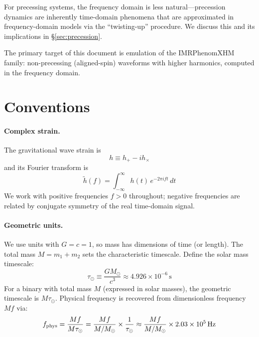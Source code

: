 \documentclass[11pt,a4paper]{article}
\begin{document}
For precessing systems, the frequency domain is less natural---precession dynamics are inherently time-domain phenomena that are approximated in frequency-domain models via the ``twisting-up'' procedure. We discuss this and its implications in \S\ref{sec:precession}.

The primary target of this document is emulation of the IMRPhenomXHM family: non-precessing (aligned-spin) waveforms with higher harmonics, computed in the frequency domain.

\section{Conventions}
\label{sec:conventions}

\paragraph{Complex strain.} The gravitational wave strain is
\begin{equation}
    h \equiv h_+ - i h_\times
    \label{eq:strain_def}
\end{equation}
and its Fourier transform is
\begin{equation}
    \tilde{h}(f) = \int_{-\infty}^{\infty} h(t) \, e^{-2\pi i f t} \, dt
\end{equation}
We work with positive frequencies $f > 0$ throughout; negative frequencies are related by conjugate symmetry of the real time-domain signal.

\paragraph{Geometric units.} We use units with $G = c = 1$, so mass has dimensions of time (or length). The total mass $M = m_1 + m_2$ sets the characteristic timescale. Define the solar mass timescale:
\begin{equation}
    \tau_\odot \equiv \frac{G M_\odot}{c^3} \approx 4.926 \times 10^{-6} \, \text{s}
\end{equation}
For a binary with total mass $M$ (expressed in solar masses), the geometric timescale is $M \tau_\odot$. Physical frequency is recovered from dimensionless frequency $Mf$ via:
\begin{equation}
    f_{\rm phys} = \frac{Mf}{M \tau_\odot} = \frac{Mf}{M/M_\odot} \times \frac{1}{\tau_\odot} \approx \frac{Mf}{M/M_\odot} \times 2.03 \times 10^5 \, \text{Hz}
\end{equation}
\end{document}
